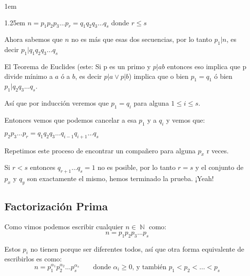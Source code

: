 \documentclass[12pt, fleqn]{report}                             %
\newenvironment{Indentation}[1][0.75em]                         %
    {\begin{adjustwidth}{#1}{}}                                     %
    {\end{adjustwidth}}                                             %
\newenvironment{SmallIndentation}[1][0.75em]                    %
    {\begin{adjustwidth}{#1}{}\begin{footnotesize}}                 %
    {\end{footnotesize}\end{adjustwidth}}                           %
\DeclareMathOperator \Space {\quad}                             %
\DeclareMathOperator \Naturals  {\mathbb{N}}                     %
\begin{document}
\begin{SmallIndentation}[1em]
\begin{Indentation}[1.25em]
                $n=p_1p_2p_3\dots p_r = q_1q_2q_3\dots q_s$ donde $r \leq s$

                Ahora sabemos que $n$ no es más que esas dos secuencias, por 
                lo tanto $p_1|n$, es decir $p_1|q_1q_2q_3\dots q_s$

                El Teorema de Euclides (este: Si p es un primo y $p|ab$ entonces
                eso implica que p divide mínimo a $a$ ó a $b$, es decir
                $p|a \lor p|b$) implica que o bien $p_1=q_1$ ó bien
                $p_1|q_2q_3\dots q_s$.

                Así que por inducción veremos que $p_1=q_i$ para alguna
                $1 \leq i \leq s$.

                Entonces vemos que podemos cancelar a esa $p_1$ y a $q_i$ y vemos
                que:

                $p_2p_3\dots p_r = q_1q_2q_3\dots q_{i-1}q_{i+1} \dots q_s$

                Repetimos este proceso de encontrar un compañero para alguna $p_x$
                r veces.

                Si $r < s$ entonces $q_{r+1} \dots q_s = 1$ no es posible,
                por lo tanto $r=s$ y el conjunto de $p_x$ y $q_y$ son exactamente
                el mismo, hemos terminado la prueba. ¡Yeah!



            \end{Indentation}
            
        \end{SmallIndentation}



        \clearpage
        \subsection{Factorización Prima}

            Como vimos podemos escribir cualquier $n \in \Naturals$ como:
            \begin{equation}
                n = p_1 p_2 p_3 \dots p_s
            \end{equation}

            Estos $p_i$ no tienen porque ser diferentes todos, así que 
            otra forma equivalente de escribirlos es como:
            \begin{equation}
                n = p_1^{\alpha_1}p_2^{\alpha_2} \dots p_s^{\alpha_s}
                \Space
                \text{ donde }
                \alpha_i \geq 0 \text{, y también } p_1 < p_2 < \dots < p_s
            \end{equation}
\end{document}
